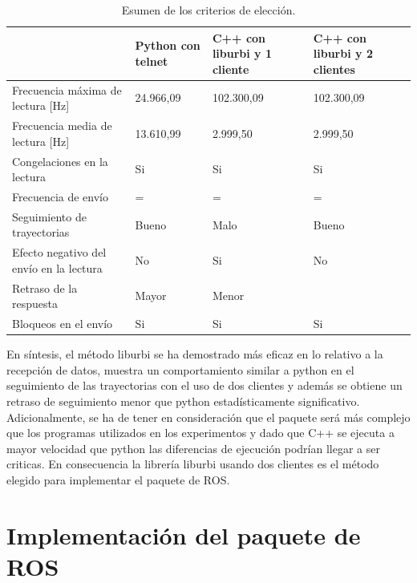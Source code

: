 \documentclass[12pt,a4paper,final,twoside]{book}
\begin{document}
\begin{table}[H]
\begin{center}
\begin{tabulary}{\textwidth}{|p{4cm}|p{3cm}|p{3cm}|p{3cm}|}
\hline

&\textbf{Python con telnet} & \textbf{C++ con liburbi y 1 cliente} & \textbf{C++ con liburbi y 2 clientes} \\ \hline
Frecuencia máxima de lectura [Hz]& 24.966,09 & 102.300,09 & 102.300,09 \\ \hline
Frecuencia media de lectura [Hz]& 13.610,99& 2.999,50 & 2.999,50  \\ \hline
Congelaciones en la lectura & Si & Si &Si \\ \hline
Frecuencia de envío& = & = & = \\ \hline
Seguimiento de trayectorias & Bueno & Malo & Bueno \\ \hline
Efecto negativo del envío en la lectura& No & Si & No \\ \hline
Retraso de la respuesta & Mayor & Menor & \\ \hline
Bloqueos en el envío & Si & Si & Si \\ \hline
\end{tabulary}
\end{center}
\caption{Esumen de los criterios de elección.\label{comp}}
\end{table}


En síntesis, el método liburbi se ha demostrado más eficaz en lo relativo a la recepción de datos, muestra un comportamiento similar a python en el seguimiento de las trayectorias con el uso de dos clientes y además se obtiene un retraso de seguimiento menor que python estadísticamente significativo. Adicionalmente, se ha de tener en consideración que el paquete será más complejo que los programas utilizados en los experimentos y dado que C++ se ejecuta a mayor velocidad que python las diferencias de ejecución podrían llegar a ser criticas.
En consecuencia la librería liburbi usando dos clientes es el método elegido para implementar el paquete de ROS.


\newpage
\chapter{Implementación del paquete de ROS}
\thispagestyle{fancy}
\end{document}
